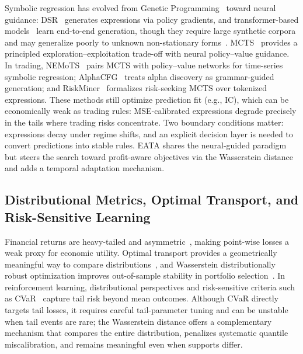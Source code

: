 \documentclass{elektr}
\theoremstyle{corollary}
\theoremstyle{lemma}
\theoremstyle{proposition}
\theoremstyle{axiom}
\theoremstyle{conjecture}
\theoremstyle{example}
\theoremstyle{definition}
\theoremstyle{remark}
\begin{document}
Symbolic regression has evolved from Genetic Programming~\cite{koza1994genetic} toward neural guidance: DSR~\cite{petersen2021deep} generates expressions via policy gradients, and transformer-based models~\cite{biggio2021neural,kamienny2022end} learn end-to-end generation, though they require large synthetic corpora and may generalize poorly to unknown non-stationary forms~\cite{makke2024interpretable}. MCTS~\cite{coulom2006efficient} provides a principled exploration--exploitation trade-off with neural policy--value guidance. In trading, NEMoTS~\cite{xie2024nemots} pairs MCTS with policy--value networks for time-series symbolic regression; AlphaCFG~\cite{yang2026alpha} treats alpha discovery as grammar-guided generation; and RiskMiner~\cite{ren2024riskminer} formalizes risk-seeking MCTS over tokenized expressions. These methods still optimize prediction fit (e.g., IC), which can be economically weak as trading rules: MSE-calibrated expressions degrade precisely in the tails where trading risks concentrate. Two boundary conditions matter: expressions decay under regime shifts, and an explicit decision layer is needed to convert predictions into stable rules. EATA shares the neural-guided paradigm but steers the search toward profit-aware objectives via the Wasserstein distance and adds a temporal adaptation mechanism.

\subsection{Distributional Metrics, Optimal Transport, and Risk-Sensitive Learning}

Financial returns are heavy-tailed and asymmetric~\cite{cont2001empirical}, making point-wise losses a weak proxy for economic utility. Optimal transport provides a geometrically meaningful way to compare distributions~\cite{villani2009optimal}, and Wasserstein distributionally robust optimization improves out-of-sample stability in portfolio selection~\cite{pesenti2023pOrtfolio}. In reinforcement learning, distributional perspectives and risk-sensitive criteria such as CVaR~\cite{chow2015cvar} capture tail risk beyond mean outcomes. Although CVaR directly targets tail losses, it requires careful tail-parameter tuning and can be unstable when tail events are rare; the Wasserstein distance offers a complementary mechanism that compares the entire distribution, penalizes systematic quantile miscalibration, and remains meaningful even when supports differ.
\end{document}
